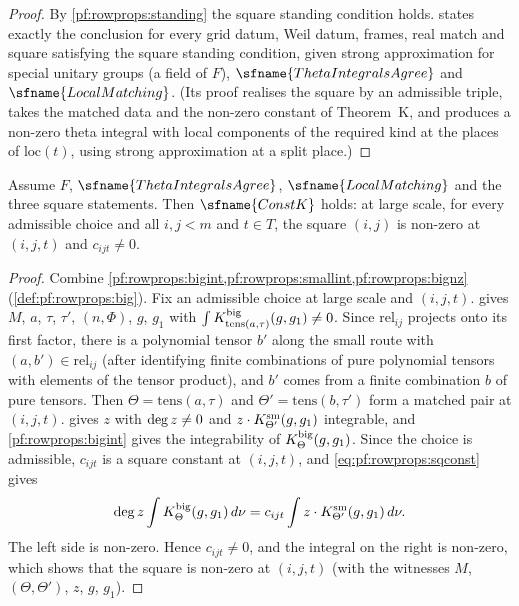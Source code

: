 \begin{proof}
By \cref{pf:rowprops:standing} the square standing condition holds. 
states exactly the conclusion for every grid datum, Weil datum, frames, real match and square satisfying the square
standing condition, given strong approximation for special unitary groups (a field of $F$),
$\sfname{ThetaIntegralsAgree}$ and $\sfname{LocalMatching}$. (Its proof realises the square by an admissible triple, takes
the matched data and the non-zero constant of Theorem~K, and produces a non-zero theta integral with local components of
the required kind at the places of $\mathrm{loc}(t)$, using strong approximation at a split place.)
\end{proof}

\begin{proposition}\label{pf:rowprops:constK}
Assume $F$, $\sfname{ThetaIntegralsAgree}$, $\sfname{LocalMatching}$ and the three square statements. Then
$\sfname{ConstK}$ holds: at large scale, for every admissible choice and all $i,j<m$ and $t\in T$, the square $(i,j)$
is non-zero at $(i,j,t)$ and $c_{ijt}\ne0$.
\end{proposition}

\begin{proof}
Combine \cref{pf:rowprops:bigint,pf:rowprops:smallint,pf:rowprops:bignz} (\cref{def:pf:rowprops:big}). Fix an admissible
choice at large scale and $(i,j,t)$.  gives $M$, $a$, $\tau$, $\tau'$, $(n,\Phi)$, $g$, $g_1$ with
$\int K^{\mathrm{big}}_{\mathrm{tens}(a,\tau)}(g,g_1)\ne0$. Since $\mathrm{rel}_{ij}$ projects onto its first factor, there is a
polynomial tensor $b'$ along the small route with $(a,b')\in\mathrm{rel}_{ij}$ (after identifying finite combinations
of pure polynomial tensors with elements of the tensor product), and $b'$ comes from a finite combination $b$ of pure
tensors. Then $\Theta=\mathrm{tens}(a,\tau)$ and $\Theta'=\mathrm{tens}(b,\tau')$ form a matched pair at $(i,j,t)$.
 gives $z$ with $\deg z\ne0$ and $z\cdot K^{\mathrm{sm}}_{\Theta'}(g,g_1)$ integrable,
and \cref{pf:rowprops:bigint} gives the integrability of $K^{\mathrm{big}}_\Theta(g,g_1)$. Since the choice is admissible,
$c_{ijt}$ is a square constant at $(i,j,t)$, and \eqref{eq:pf:rowprops:sqconst} gives
\[
\deg z\int K^{\mathrm{big}}_\Theta(g,g_1)\,d\nu=c_{ijt}\int z\cdot K^{\mathrm{sm}}_{\Theta'}(g,g_1)\,d\nu .
\]
The left side is non-zero. Hence $c_{ijt}\ne0$, and the integral on the right is non-zero, which shows that the square is
non-zero at $(i,j,t)$ (with the witnesses $M$, $(\Theta,\Theta')$, $z$, $g$, $g_1$).
\end{proof}

